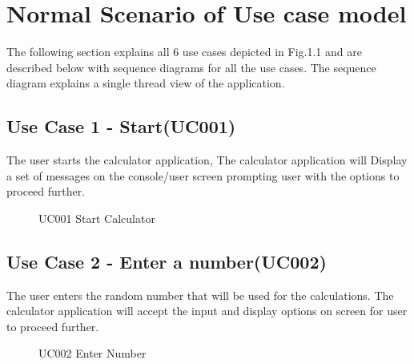 \documentclass[12pt, a4paper]{report}
\begin{document}
\section{Normal Scenario of Use case model}
\quad The following section explains all 6 use cases depicted in Fig.1.1 and are described below with sequence diagrams for all the use cases. The sequence diagram explains a single thread view of the application.
\subsection{Use Case 1 - Start(UC001)}
\quad The user starts the calculator application, The calculator application will Display a set of messages on the console/user screen prompting user with the options to proceed further.
\begin{figure}[h]
    \centering
    \caption{UC001 Start Calculator}
    \label{fig:UC001 Start Calculator}
\end{figure}

\subsection{Use Case 2 - Enter a number(UC002)}
\quad The user enters the random number that will be used for the calculations. The calculator application will accept the input and display options on screen for user to proceed further.
\begin{figure}[!h]
    \centering
    \caption{UC002 Enter Number}
    \label{fig:UC002 Enter Number}
\end{figure}
\end{document}
